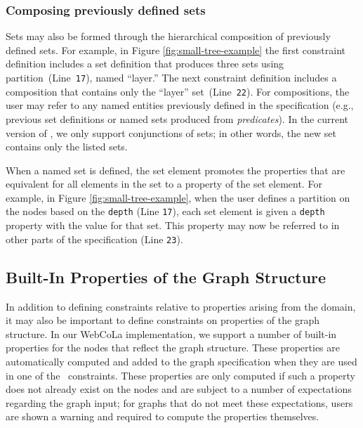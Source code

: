 \subsubsection{Composing previously defined sets}
Sets may also be formed through the hierarchical
composition of previously defined sets. For example, in Figure
\ref{fig:small-tree-example} the first constraint definition includes a 
set definition that produces three sets using partition~(Line~\texttt{17}),
named ``layer.'' The next constraint definition includes a composition 
that contains only the ``layer'' set~(Line~\texttt{22}). For compositions, the user may
refer to any named entities previously defined in the specification (e.g.,
previous set definitions or named sets produced from \emph{predicates}).
In the current version of \projectname, we only support conjunctions of
sets; in other words, the new set contains only the listed sets.

When a named set is defined, the set element promotes the properties that
are equivalent for all elements in the set to a property of the set
element. For example, in Figure \ref{fig:small-tree-example}, when the user
defines a partition on the nodes based on the \texttt{depth} (Line
\texttt{17}), each set element is given a \texttt{depth} property with
the value for that set. This property may now be referred to in other parts
of the \projectname specification (Line \texttt{23}).

\subsection{Built-In Properties of the Graph Structure}
In addition to defining constraints relative to properties arising from
the domain, it may also be important to define constraints on properties
of the graph structure. In our WebCoLa implementation, we support a 
number of built-in properties for the nodes that reflect the graph structure.
These properties are automatically computed and added to the graph 
specification when they are used in one of the \projectname\ constraints. 
These properties are only computed if such a property does not
already exist on the nodes and are subject to a number of expectations
regarding the graph input; for graphs that do not meet these expectations,
users are shown a warning and required to compute the properties
themselves.

